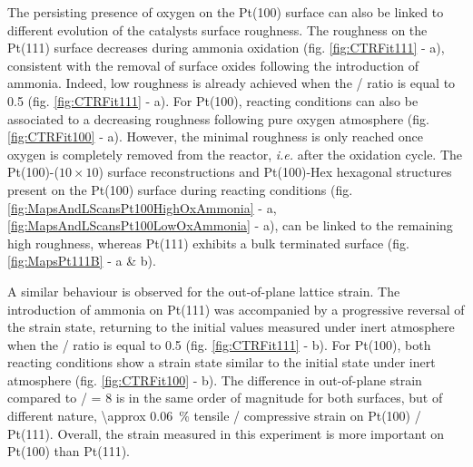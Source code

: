 The persisting presence of oxygen on the Pt(100) surface can also be linked to different evolution of the catalysts surface roughness.
The roughness on the Pt(111) surface decreases during ammonia oxidation (fig. \ref{fig:CTRFit111} - a), consistent with the removal of surface oxides following the introduction of ammonia.
Indeed, low roughness is already achieved when the / ratio is equal to \num{0.5} (fig. \ref{fig:CTRFit111} - a).
For Pt(100), reacting conditions can also be associated to a decreasing roughness following pure oxygen atmosphere (fig. \ref{fig:CTRFit100} - a).
However, the minimal roughness is only reached once oxygen is completely removed from the reactor, \textit{i.e.} after the oxidation cycle.
The  Pt(100)-($10\times10$) surface reconstructions and Pt(100)-Hex hexagonal structures present on the Pt(100) surface during reacting conditions (fig. \ref{fig:MapsAndLScansPt100HighOxAmmonia} - a, \ref{fig:MapsAndLScansPt100LowOxAmmonia} - a), can be linked to the remaining high roughness, whereas Pt(111) exhibits a bulk terminated surface (fig. \ref{fig:MapsPt111B} - a \& b).

A similar behaviour is observed for the out-of-plane lattice strain.
The introduction of ammonia on Pt(111) was accompanied by a progressive reversal of the strain state, returning to the initial values measured under inert atmosphere when the / ratio is equal to \num{0.5} (fig. \ref{fig:CTRFit111} - b).
For Pt(100), both reacting conditions show a strain state similar to the initial state under inert atmosphere (fig. \ref{fig:CTRFit100} - b).
The difference in out-of-plane strain compared to / = 8 is in the same order of magnitude for both surfaces, but of different nature, \qty{\approx 0.06}{\percent} tensile / compressive strain on Pt(100) /  Pt(111).
Overall, the strain measured in this experiment is more important on Pt(100) than Pt(111).


